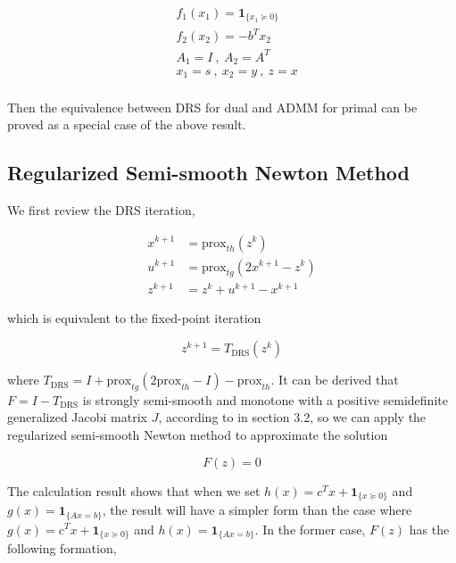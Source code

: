 \documentclass[a4paper]{article}
\begin{document}
\begin{equation}\label{key}
\begin{split}
& f_1(x_1) = \mathbf{1}_{\{x_1\succeq0\}}\\
& f_2(x_2) = -b^Tx_2\\
& A_1 = I \ , \  A_2 = A^T\\
& x_1=s \ , \  x_2= y \ , \ z= x\\
\end{split}
\end{equation}

Then the equivalence between DRS for dual and ADMM for primal can be proved as a special case of the above result.


\subsection{Regularized Semi-smooth Newton Method}
We first review the DRS iteration, 

\begin{equation}\label{DRS1}
\begin{split}
x^{k+1} &= \mathrm{prox}_{th}(z^k) \\
u^{k+1} &= \mathrm{prox}_{tg}(2x^{k+1}-z^k) \\
z^{k+1} &= z^{k}+u^{k+1}-x^{k+1}
\end{split}
\end{equation}

which is equivalent to the fixed-point iteration 

\begin{equation*}
z^{k+1}=T_{\text{DRS}}(z^k)
\end{equation*}

where $T_{\text{DRS}}=I + \mathrm{prox}_{tg}(2\mathrm{prox}_{th}-I)-\mathrm{prox}_{th}$. It can be derived that $F=I-T_{\text{DRS}}$ is strongly semi-smooth and monotone with a positive semidefinite generalized Jacobi matrix $J$, according to \cite{xiao} in section 3.2, so we can apply the regularized semi-smooth Newton method to approximate the solution

\begin{equation}
F(z)=0
\end{equation}

The calculation result shows that when we set $h(x) = c^Tx + \mathbf{1}_{\{x\succeq0\}}$ and $g(x)=\mathbf{1}_{\{Ax=b\}}$, the result will have a simpler form than the case where $g(x) = c^Tx + \mathbf{1}_{\{x\succeq0\}}$ and $h(x)=\mathbf{1}_{\{Ax=b\}}$. In the former case, $F(z)$ has the following formation, 
\end{document}

